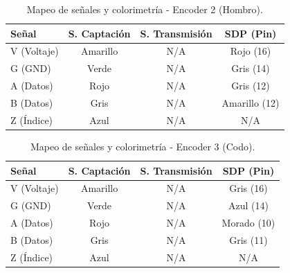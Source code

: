 	\begin{table}[h]
		\centering
		\caption{Mapeo de señales y colorimetría - Encoder 2 (Hombro).}
		\label{tab:encoder_hombro}
		\renewcommand{\arraystretch}{1.5}
		\begin{tabular}{lccc}
			\toprule
			\textbf{Señal} & \textbf{S. Captación} & \textbf{S. Transmisión} & \textbf{SDP (Pin)} \\ \midrule
			V (Voltaje)    & Amarillo              & N/A                     & Rojo (16)          \\
			G (GND)        & Verde                 & N/A                     & Gris (14)          \\
			A (Datos)      & Rojo                  & N/A                     & Gris (12)          \\
			B (Datos)      & Gris                  & N/A                     & Amarillo (12)      \\
			Z (Índice)     & Azul                  & N/A                     &  N/A        \\ \bottomrule
		\end{tabular}
	\end{table}
	
	\begin{table}[h]
		\centering
		\caption{Mapeo de señales y colorimetría - Encoder 3 (Codo).}
		\label{tab:encoder_codo}
		\renewcommand{\arraystretch}{1.5}
		\begin{tabular}{lccc}
			\toprule
			\textbf{Señal} & \textbf{S. Captación} & \textbf{S. Transmisión} & \textbf{SDP (Pin)} \\ \midrule
			V (Voltaje)    & Amarillo              & N/A                     & Gris (16)          \\
			G (GND)        & Verde                 & N/A                     & Azul (14)          \\
			A (Datos)      & Rojo                  & N/A                     & Morado (10)        \\
			B (Datos)      & Gris                  & N/A                     & Gris (11)          \\
			Z (Índice)     & Azul                  & N/A                     & N/A       \\ \bottomrule
		\end{tabular}
	\end{table}
	

